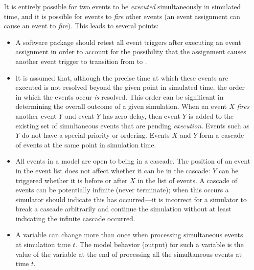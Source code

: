 It is entirely possible for two events to be \emph{executed}
simultaneously in simulated time, and it is possible for events to
\emph{fire} other events (\ie an event assignment can cause an
event to \emph{fire}).  This leads to several points:
\begin{itemize}

\item A software package should retest all event triggers after
  executing an event assignment in order to account for the
  possibility that the assignment causes another event trigger to
  transition from  to .

\item It is assumed that, although the precise time at which these
  events are executed is not resolved beyond the given point in
  simulated time, the order in which the events occur \emph{is}
  resolved.  This order can be significant in determining the
  overall outcome of a given simulation.  When an event $X$
  \emph{fires} another event $Y$ and event $Y$ has zero delay,
  then event $Y$ is added to the existing set of simultaneous
  events that are pending \emph{execution}.  Events such as $Y$ do
  not have a special priority or ordering.  Events $X$ and $Y$
  form a cascade of events at the same point in simulation time.

\item All events in a model are open to being in a cascade.  The
  position of an event in the event list does not affect whether
  it can be in the cascade: $Y$ can be triggered whether it is
  before or after $X$ in the list of events.  A cascade of events
  can be potentially infinite (never terminate); when this occurs
  a simulator should indicate this has occurred---it is incorrect
  for a simulator to break a cascade arbitrarily and continue the
  simulation without at least indicating the infinite cascade
  occurred.

\item A variable can change more than once when processing
  simultaneous events at simulation time $t$.  The model behavior
  (output) for such a variable is the value of the variable at the
  end of processing all the simultaneous events at time $t$.

\end{itemize}




